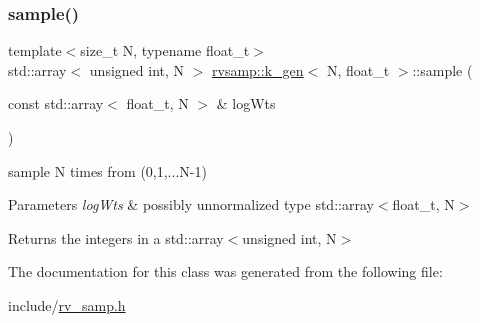 \subsubsection{\texorpdfstring{sample()}{sample()}}
{\footnotesize\ttfamily template$<$size\+\_\+t N, typename float\+\_\+t$>$ \\
std\+::array$<$ unsigned int, N $>$ \hyperlink{classrvsamp_1_1k__gen}{rvsamp\+::k\+\_\+gen}$<$ N, float\+\_\+t $>$\+::sample (\begin{DoxyParamCaption}\item[{const std\+::array$<$ float\+\_\+t, N $>$ \&}]{log\+Wts }\end{DoxyParamCaption})}



sample N times from (0,1,...N-\/1) 


\begin{DoxyParams}{Parameters}
{\em log\+Wts} & possibly unnormalized type std\+::array$<$float\+\_\+t, N$>$ \\
\hline
\end{DoxyParams}
\begin{DoxyReturn}{Returns}
the integers in a std\+::array$<$unsigned int, N$>$ 
\end{DoxyReturn}


The documentation for this class was generated from the following file\+:\begin{DoxyCompactItemize}
\item 
include/\hyperlink{rv__samp_8h}{rv\+\_\+samp.\+h}\end{DoxyCompactItemize}
